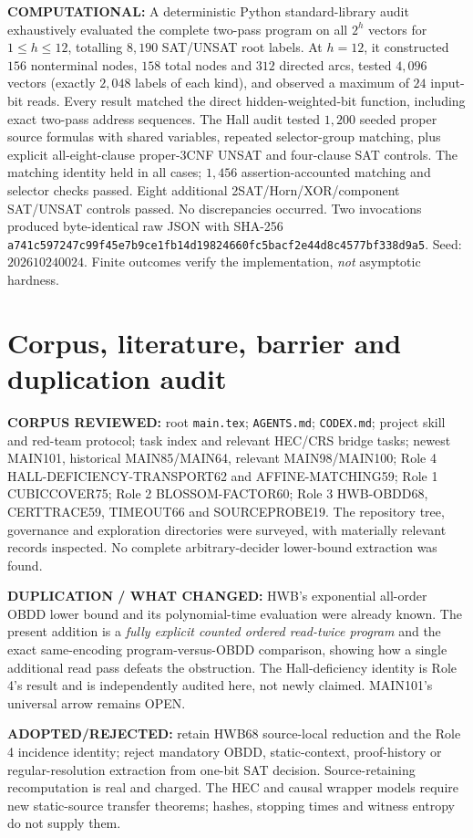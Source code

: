\documentclass[11pt]{article}
\begin{document}
\textbf{COMPUTATIONAL:} A deterministic Python standard-library audit exhaustively evaluated the complete two-pass program on all $2^h$ vectors for $1\le h\le12$, totalling $8{,}190$ SAT/UNSAT root labels. At $h=12$, it constructed $156$ nonterminal nodes, $158$ total nodes and $312$ directed arcs, tested $4{,}096$ vectors (exactly $2{,}048$ labels of each kind), and observed a maximum of $24$ input-bit reads. Every result matched the direct hidden-weighted-bit function, including exact two-pass address sequences. The Hall audit tested $1{,}200$ seeded proper source formulas with shared variables, repeated selector-group matching, plus explicit all-eight-clause proper-3CNF UNSAT and four-clause SAT controls. The matching identity held in all cases; $1{,}456$ assertion-accounted matching and selector checks passed. Eight additional 2SAT/Horn/XOR/component SAT/UNSAT controls passed. No discrepancies occurred. Two invocations produced byte-identical raw JSON with SHA-256 \texttt{a741c597247c99f45e7b9ce1fb14d19824660fc5bacf2e44d8c4577bf338d9a5}.
Seed: $202610240024$. Finite outcomes verify the implementation, \emph{not} asymptotic hardness.

\section{Corpus, literature, barrier and duplication audit}
\textbf{CORPUS REVIEWED:} root \texttt{main.tex}; \texttt{AGENTS.md}; \texttt{CODEX.md}; project skill and red-team protocol; task index and relevant HEC/CRS bridge tasks; newest MAIN101, historical MAIN85/MAIN64, relevant MAIN98/MAIN100; Role 4 HALL-DEFICIENCY-TRANSPORT62 and AFFINE-MATCHING59; Role 1 CUBICCOVER75; Role 2 BLOSSOM-FACTOR60; Role 3 HWB-OBDD68, CERTTRACE59, TIMEOUT66 and SOURCEPROBE19. The repository tree, governance and exploration directories were surveyed, with materially relevant records inspected. No complete arbitrary-decider lower-bound extraction was found.

\textbf{DUPLICATION / WHAT CHANGED:} HWB's exponential all-order OBDD lower bound and its polynomial-time evaluation were already known. The present addition is a \emph{fully explicit counted ordered read-twice program} and the exact same-encoding program-versus-OBDD comparison, showing how a single additional read pass defeats the obstruction. The Hall-deficiency identity is Role 4's result and is independently audited here, not newly claimed. MAIN101's universal arrow remains OPEN.

\textbf{ADOPTED/REJECTED:} retain HWB68 source-local reduction and the Role 4 incidence identity; reject mandatory OBDD, static-context, proof-history or regular-resolution extraction from one-bit SAT decision. Source-retaining recomputation is real and charged. The HEC and causal wrapper models require new static-source transfer theorems; hashes, stopping times and witness entropy do not supply them.
\end{document}
